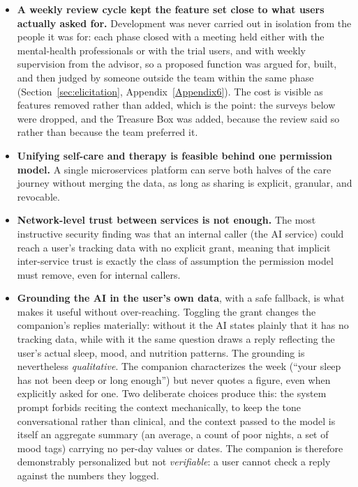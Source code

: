 \begin{itemize}
\item \textbf{A weekly review cycle kept the feature set close to what users actually asked for.} Development was never carried out in isolation from the people it was for: each phase closed with a meeting held either with the mental-health professionals or with the trial users, and with weekly supervision from the advisor, so a proposed function was argued for, built, and then judged by someone outside the team within the same phase (Section~\ref{sec:elicitation}, Appendix~\ref{Appendix6}). The cost is visible as features removed rather than added, which is the point: the surveys below were dropped, and the Treasure Box was added, because the review said so rather than because the team preferred it.

\item \textbf{Unifying self-care and therapy is feasible behind one permission model.} A single microservices platform can serve both halves of the care journey without merging the data, as long as sharing is explicit, granular, and revocable.
\item \textbf{Network-level trust between services is not enough.} The most instructive security finding was that an internal caller (the AI service) could reach a user's tracking data with no explicit grant, meaning that implicit inter-service trust is exactly the class of assumption the permission model must remove, even for internal callers.
\item \textbf{Grounding the AI in the user's own data}, with a safe fallback, is what makes it useful without over-reaching. Toggling the grant changes the companion's replies materially: without it the AI states plainly that it has no tracking data, while with it the same question draws a reply reflecting the user's actual sleep, mood, and nutrition patterns. The grounding is nevertheless \emph{qualitative}. The companion characterizes the week (``your sleep has not been deep or long enough'') but never quotes a figure, even when explicitly asked for one. Two deliberate choices produce this: the system prompt forbids reciting the context mechanically, to keep the tone conversational rather than clinical, and the context passed to the model is itself an aggregate summary (an average, a count of poor nights, a set of mood tags) carrying no per-day values or dates. The companion is therefore demonstrably personalized but not \emph{verifiable}: a user cannot check a reply against the numbers they logged.
\end{itemize}

